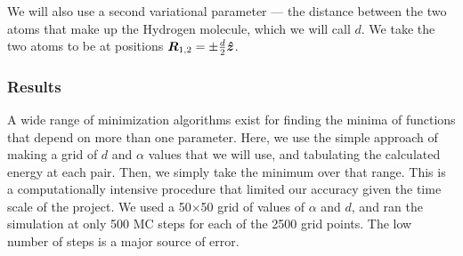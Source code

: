 \documentclass[12pt]{article}
\numberwithin{equation}{section}
\begin{document}
We will also use a second variational parameter --- the distance between the two atoms that make up the Hydrogen molecule, which we will call $d$.  We take the two atoms to be at positions $\vb*R_{1,2} = \pm \frac{d}{2}\vu*z$.

\subsubsection{Results}
A wide range of minimization algorithms exist for finding the minima of functions that depend on more than one parameter.  Here, we use the simple approach of making a grid of $d$ and $\alpha$ values that we will use, and tabulating the calculated energy at each pair.  Then, we simply take the minimum over that range.  This is a computationally intensive procedure that limited our accuracy given the time scale of the project.  We used a 50$\times$50 grid of values of $\alpha$ and $d$, and ran the simulation at only 500 MC steps for each of the 2500 grid points.  The low number of steps is a major source of error.
\end{document}
